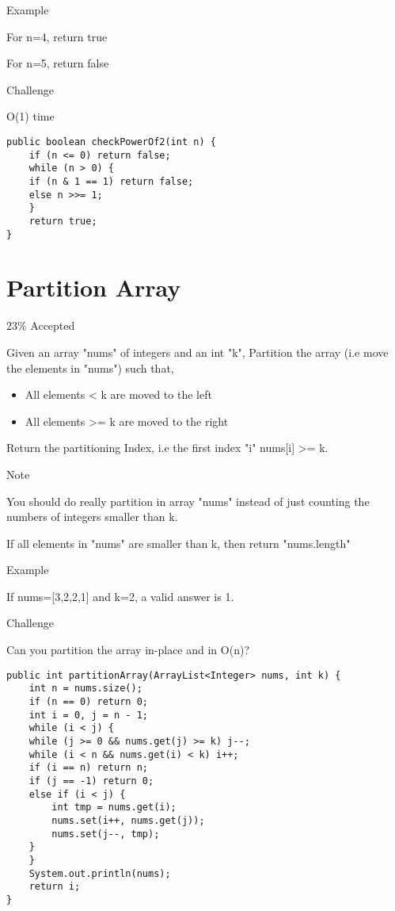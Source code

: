 \documentclass[12pt]{book}
\begin{document}
Example

For n=4, return true

For n=5, return false

Challenge

O(1) time
\lstset{language=java,label= ,caption= ,numbers=none}
\begin{lstlisting}
public boolean checkPowerOf2(int n) {
    if (n <= 0) return false;
    while (n > 0) {
	if (n & 1 == 1) return false;
	else n >>= 1;
    }
    return true;
}
\end{lstlisting}
\chapter{Partition Array}
\label{sec-47}

23\% Accepted

Given an array "nums" of integers and an int "k", Partition the array (i.e move the elements in "nums") such that,

\begin{itemize}
\item All elements < k are moved to the left

\item All elements >= k are moved to the right
\end{itemize}

Return the partitioning Index, i.e the first index "i" nums[i] >= k.

Note

You should do really partition in array "nums" instead of just counting the numbers of integers smaller than k.

If all elements in "nums" are smaller than k, then return "nums.length"

Example

If nums=[3,2,2,1] and k=2, a valid answer is 1.

Challenge

Can you partition the array in-place and in O(n)?
\lstset{language=java,label= ,caption= ,numbers=none}
\begin{lstlisting}
public int partitionArray(ArrayList<Integer> nums, int k) {
    int n = nums.size();
    if (n == 0) return 0;
    int i = 0, j = n - 1;
    while (i < j) {
	while (j >= 0 && nums.get(j) >= k) j--;
	while (i < n && nums.get(i) < k) i++;
	if (i == n) return n;
	if (j == -1) return 0;
	else if (i < j) {
	    int tmp = nums.get(i);
	    nums.set(i++, nums.get(j));
	    nums.set(j--, tmp);
	}
    }
    System.out.println(nums);
    return i;
}
\end{lstlisting}
\end{document}
